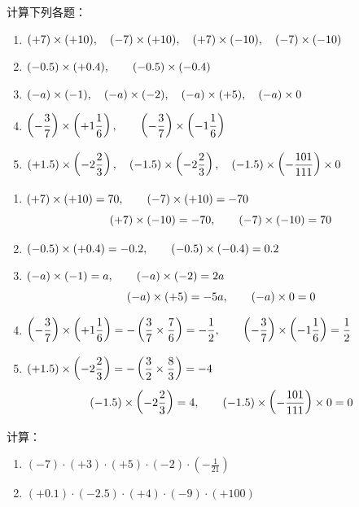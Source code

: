 \begin{example}
    计算下列各题：
\begin{enumerate}
    \item $(+7)\times (+10),\quad (-7)\times (+10),\quad (+7)\times (-10),\quad (-7)\times (-10)$
    \item $(-0.5)\times (+0.4),\qquad (-0.5)\times (-0.4)$
    \item $(-a)\times (-1),\quad (-a)\times (-2),\quad (-a)\times (+5),\quad (-a)\times 0$
    \item $\left(-\dfrac{3}{7}\right)\times \left(+1\dfrac{1}{6}\right),\qquad \left(-\dfrac{3}{7}\right)\times \left(-1\dfrac{1}{6}\right)$
    \item $(+1.5)\times \left(-2\dfrac{2}{3}\right),\quad (-1.5)\times \left(-2\dfrac{2}{3}\right),\quad (-1.5)\times \left(-\dfrac{101}{111}\right)\times 0$
\end{enumerate}

\end{example}

\begin{solution}
\begin{enumerate}
\item $(+7)\times (+10)=70,\qquad (-7)\times (+10)=-70$ 
\[(+7)\times (-10)=-70,\qquad (-7)\times (-10)=70\]
\item $(-0.5)\times (+0.4)=-0.2,\qquad (-0.5)\times (-0.4)=0.2$
\item $(-a)\times (-1)=a,\qquad (-a)\times (-2)=2a$  $$(-a)\times (+5)=-5a,\qquad (-a)\times 0=0$$
\item $\left(-\dfrac{3}{7}\right)\times \left(+1\dfrac{1}{6}\right)=-\left(\dfrac{3}{7}\times\dfrac{7}{6}\right)=-\dfrac{1}{2},\qquad \left(-\dfrac{3}{7}\right)\times \left(-1\dfrac{1}{6}\right)=\dfrac{1}{2} $
\item  $(+1.5)\times \left(-2\dfrac{2}{3}\right)=-\left(\dfrac{3}{2}\times\dfrac{8}{3}\right)=-4$
\[(-1.5)\times \left(-2\dfrac{2}{3}\right)=4,\qquad (-1.5)\times \left(-\dfrac{101}{111}\right)\times 0=0 \]
\end{enumerate}

\end{solution}  

\begin{example}
    计算：
\begin{enumerate}
    \item $(-7) \cdot(+3) \cdot(+5) \cdot(-2) \cdot\left(-\frac{1}{21}\right)$
    \item 
    $(+0.1) \cdot(-2.5) \cdot(+4) \cdot(-9) \cdot(+100)$
\end{enumerate}
\end{example}

